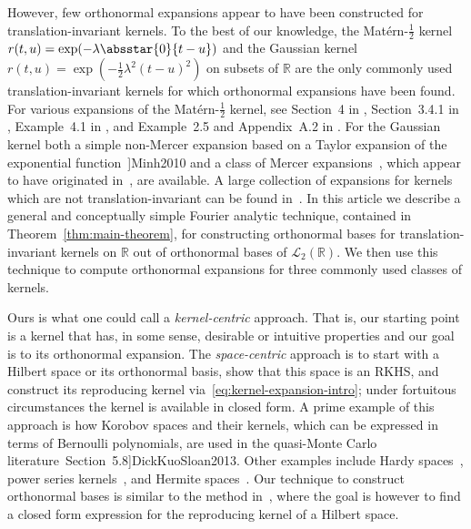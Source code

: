\documentclass{article}
\newcommand{\tmcolor}[2]{{\color{#1}{#2}}}
\newcommand{\tmem}[1]{{\em #1\/}}
\newcommand{\R}{\mathbb{R}}
\newcommand{\rev}[1]{\tmcolor{black}{#1}}
\begin{document}
However, few orthonormal expansions appear to have been constructed for
translation-invariant kernels. To the best of our knowledge, the
Mat{\'e}rn-$\frac{1}{2}$ kernel $r (t, u) = \exp (- \lambda \absstar{0}{t -
u})$ and the Gaussian kernel $r (t, u) = \exp (- \frac{1}{2} \lambda^2 (t -
u)^2)$ on subsets of $\R$ are the only commonly used translation-invariant
kernels for which orthonormal expansions have been found. For various
expansions of the Mat{\'e}rn-$\frac{1}{2}$ kernel, see Section~4 in
{\cite{Hawkins1989}}, Section~3.4.1 in {\cite{VanTrees2001}}, Example~4.1 in
{\cite{Xiu2010}}, and Example~2.5 and Appendix~A.2 in
{\cite{FasshauerMcCourt2015}}. For the Gaussian kernel both a simple
non-Mercer expansion based on a Taylor expansion of the exponential
function~{\cite[e.g.,]{[}}]Minh2010 and a class of Mercer
expansions~{\cite[Section~12.2.1]{FasshauerMcCourt2015}}, which appear to have
originated in~{\cite[Section~4]{Zhu1998}}, are available. A large collection
of expansions for kernels which are not translation-invariant can be found
in~{\cite[Appendix~A]{FasshauerMcCourt2015}}. In this article we describe a
general and conceptually simple Fourier analytic technique, contained in
Theorem~\ref{thm:main-theorem}, for constructing orthonormal bases for
translation-invariant kernels on $\R$ out of orthonormal bases of
$\mathscr{L}_2 (\R)$. We then use this technique to compute orthonormal
expansions for three commonly used classes of kernels.

Ours is what one could call a {\tmem{kernel-centric}} approach. That is, our
starting point is a kernel that has, in some sense, desirable or intuitive
properties and our goal is to {\rev{find}} its orthonormal expansion. The
{\tmem{space-centric}} approach is to start with a Hilbert space or its
orthonormal basis, show that this space is an RKHS, and construct its
reproducing kernel via~\eqref{eq:kernel-expansion-intro}; under fortuitous
circumstances the kernel is available in closed form. A prime example of this
approach is how Korobov spaces and their kernels, which can be expressed in
terms of Bernoulli polynomials, are used in the quasi-Monte Carlo
literature~{\cite[e.g.,]{[}}Section~5.8]DickKuoSloan2013. Other examples
include Hardy spaces~{\cite[Section~1.4.2]{Paulsen2016}}, power series
kernels~{\cite{Zwickngaslc2009}}, and Hermite
spaces~{\cite{IrrgeherLeobacher2015}}. Our technique to construct orthonormal
bases is similar to the method in~{\cite{NovakUllrich2018}}, where the goal is
however to find a closed form expression for the reproducing kernel of a
Hilbert space.
\end{document}
